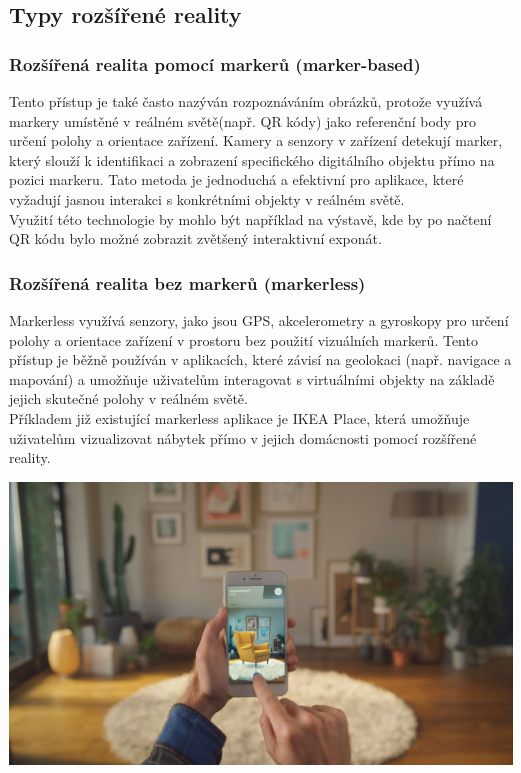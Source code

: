 \subsection{Typy rozšířené reality}
\subsubsection{Rozšířená realita pomocí markerů (marker-based)}
Tento přístup je také často nazýván rozpoznáváním obrázků, protože využívá markery umístěné v reálném světě(např. QR kódy) jako referenční body pro určení polohy a orientace zařízení. Kamery a senzory v zařízení detekují marker, který slouží k identifikaci a zobrazení specifického digitálního objektu přímo na pozici markeru. Tato metoda je jednoduchá a efektivní pro aplikace, které vyžadují jasnou interakci s konkrétními objekty v reálném světě. \cite  {AROverview} \\
Využití této technologie by mohlo být například na výstavě, kde by po načtení QR kódu bylo možné zobrazit zvětšený interaktivní exponát.
\subsubsection{Rozšířená realita bez markerů (markerless)}
Markerless využívá senzory, jako jsou GPS, akcelerometry a gyroskopy pro určení polohy a orientace zařízení v prostoru bez použití vizuálních markerů. Tento přístup je běžně používán v aplikacích, které závisí na geolokaci (např. navigace a mapování) a umožňuje uživatelům interagovat s virtuálními objekty na základě jejich skutečné polohy v reálném světě. \cite{AROverview} \\
Příkladem již existující markerless aplikace je IKEA Place, která umožňuje uživatelům vizualizovat nábytek přímo v jejich domácnosti pomocí rozšířené reality. \cite{IkeaPlace} \\
\begin{center}
    \includegraphics[scale=0.2]{images/ikea}
\end{center}
\pagebreak
